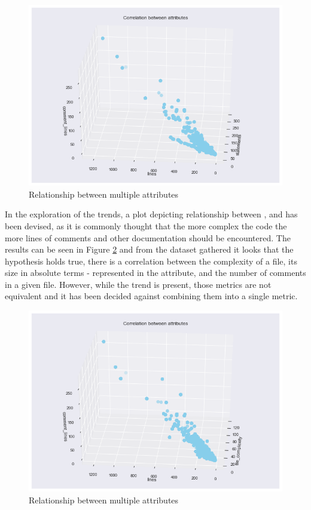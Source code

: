 \begin{enumerate}
\begin{figure}[!h]
    \centering
    \includegraphics[scale=0.65]{Figures/three-d/Correlation-between-attributes-statements-lines-comment_lines.png}
    \caption{Relationship between multiple attributes}
    \label{fig:3d:statements-lines-commentLines}
\end{figure}

In the exploration of the trends, a plot depicting relationship between \lines{}, \fileComplexity{} and \commentLines{} has been devised, as it is commonly thought that the more complex the code the more lines of comments and other documentation should be encountered. The results can be seen in Figure \ref{fig:3d:fileComplexity-lines-commentLines} and from the dataset gathered it looks that the hypothesis holds true, there is a correlation between the complexity of a file, its size in absolute terms - represented in the \lines{} attribute, and the number of comments in a given file. 
However, while the trend is present, those metrics are not equivalent and it has been decided against combining them into a single metric.
\begin{figure}[!h]
    \centering
    \includegraphics[scale=0.65]{Figures/three-d/Correlation-between-attributes-file_complexity-lines-comment_lines.png}
    \caption{Relationship between multiple attributes}
    \label{fig:3d:fileComplexity-lines-commentLines}
\end{figure}


\end{enumerate}
